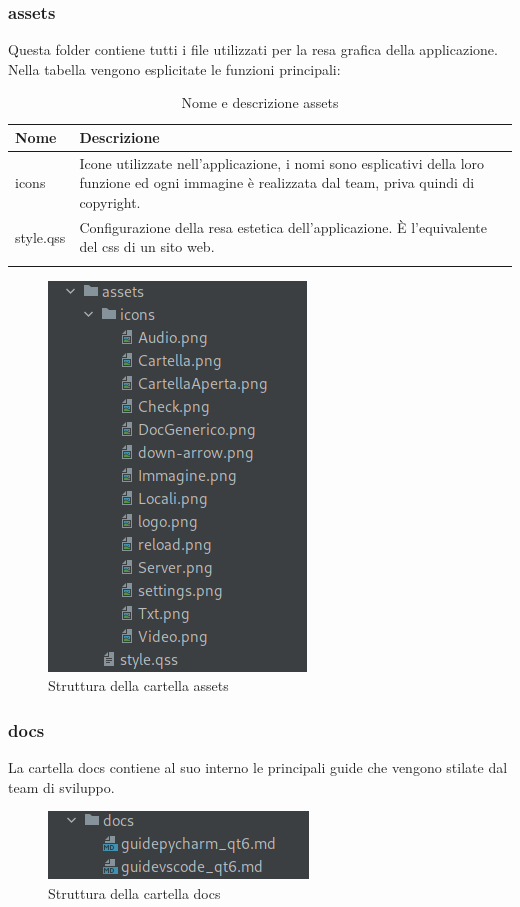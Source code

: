 \subsubsection{assets}    
Questa folder contiene tutti i file utilizzati per la resa grafica della applicazione. Nella tabella vengono esplicitate le funzioni principali:
{
	\setlength{\freewidth}{\dimexpr\textwidth-1\tabcolsep}
	\renewcommand{\arraystretch}{1.5}
	\setlength{\aboverulesep}{0pt}
	\setlength{\belowrulesep}{0pt}
	\begin{longtable}{L{.15\freewidth} L{.85\freewidth}}
		\textbf{Nome} & \textbf{Descrizione}\\
		\toprule
		\endhead	
		icons & Icone utilizzate nell'applicazione, i nomi sono esplicativi della loro funzione ed ogni immagine è realizzata dal team, priva quindi di copyright.\\
		style.qss & Configurazione della resa estetica dell'applicazione. È l'equivalente del css di un sito web.\\
		\bottomrule
		\hiderowcolors
		\caption{Nome e descrizione assets}
	\end{longtable}
}
\begin{figure}[H]
    \centering
    \includegraphics[scale = 0.5]{components/img/struttura-cartella-assets.png}
    \caption{Struttura della cartella assets}
    \label{fig:Struttura della cartella assets}
\end{figure}   
\subsubsection{docs} 
La cartella docs contiene al suo interno le principali guide che vengono stilate dal team di sviluppo.  
\begin{figure}[H]
    \centering
    \includegraphics[scale = 0.5]{components/img/struttura-cartella-docs.png}
    \caption{Struttura della cartella docs}
    \label{fig:Struttura della cartella docs}
\end{figure}    
